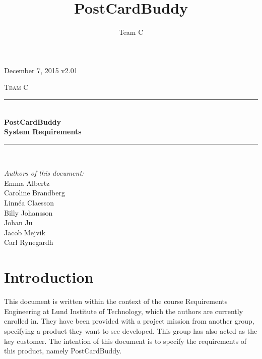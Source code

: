 \documentclass[10pt,a4paper]{article}
\title{PostCardBuddy}
\author{Team C}
\begin{document}
\begin{titlepage}
\newcommand{\HRule}{\rule{\linewidth}{0.5mm}}


\begin{flushright}
December 7, 2015 v2.01\\[3cm]
\end{flushright}


\centering
\textsc{\LARGE Team C}\\[0.5cm]

\HRule \\[0.4cm]
{ \huge \bfseries PostCardBuddy}\\[0.3cm]
{\Large \bfseries System Requirements}\\[0.4cm] %
\HRule \\[1.5cm]

\vfill
\begin{flushleft}
\textit{Authors of this document:}\\
Emma Albertz\\
Caroline Brandberg\\
Linnéa Claesson\\
Billy Johansson\\
Johan Ju\\
Jacob Mejvik\\
Carl Rynegardh
\end{flushleft}

\end{titlepage}



%



\setcounter{tocdepth}{2}
\tableofcontents
\newpage
{}

\section{Introduction}
This document is written within the context of the course Requirements Engineering at Lund Institute of Technology, which the authors are currently enrolled in. They have been provided with a project mission from another group, specifying a product they want to see developed. This group has also acted as the key customer. The intention of this document is to specify the requirements of this product, namely PostCardBuddy.
\end{document}
